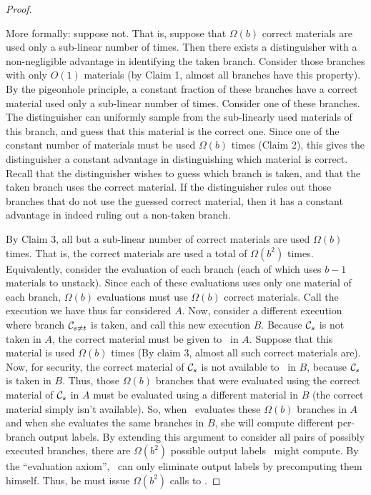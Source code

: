\begin{proof}
\begin{itemize}
\begin{subproof}
    More formally: suppose not.
    That is, suppose that $\Omega(b)$ correct materials are used only a
    sub-linear number of times.
    Then there exists a distinguisher with a non-negligible advantage
    in identifying the taken branch.
    Consider those branches with
    only $O(1)$ materials (by Claim 1, almost all branches have this
    property). By the pigeonhole principle, a constant fraction of
    these branches have a correct material used only a sub-linear
    number of times. Consider one of these branches. The distinguisher
    can uniformly sample from the sub-linearly used materials of this
    branch, and guess that this material is the correct one.
    Since one of the constant number of materials must be used
    $\Omega(b)$ times (Claim 2), this gives the distinguisher a
    constant advantage in distinguishing which material is correct.
    Recall that the distinguisher wishes to guess which branch is
    taken, and that the taken branch uses the correct material. If the
    distinguisher rules out those branches that do not use the guessed
    correct material, then it has a constant advantage in indeed ruling
    out a non-taken branch.
  \end{subproof}
\end{itemize}

By Claim 3, all but a sub-linear number of correct
materials are used $\Omega(b)$ times. That is, the correct materials are used a
total of $\Omega(b^2)$ times. Equivalently, consider the evaluation of each
branch (each of which uses $b-1$ materials to unstack). Since each of these
evaluations uses only one material of each branch, $\Omega(b)$ evaluations
must use $\Omega(b)$ correct materials.  Call the execution we have thus far
considered $A$.
Now, consider a different execution where branch
$\mathcal C_{s\neq t}$  is taken, and call this new execution $B$. Because
$\mathcal C_s$ is
not taken in $A$, the correct material must be given to \Eval\ in $A$. Suppose
that this material is used $\Omega(b)$ times (By claim 3, almost all such
correct materials are). Now, for security, the correct material of $\mathcal C_s$ is
not available to \Eval\ in $B$, because $\mathcal C_s$ is taken in $B$. Thus, those
$\Omega(b)$ branches that were evaluated using the correct material of
$\mathcal C_s$
in $A$
must be evaluated using a different material in $B$ (the correct
material
simply isn’t available). So, when \Eval\ evaluates these $\Omega(b)$ branches
in $A$ and when she evaluates the same branches in $B$, she will compute
different per-branch output labels. By extending this argument to
consider all pairs of possibly executed branches, there are $\Omega(b^2)$
possible output labels \Eval\ might compute. By the “evaluation axiom”,
\Gen\ can only eliminate output labels by precomputing them himself.
Thus, he must issue $\Omega(b^2)$ calls to \Ev.
\end{proof}



